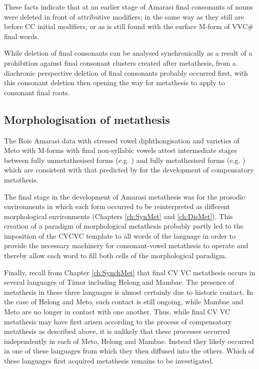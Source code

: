 These facts indicate that at an earlier
stage of Amarasi final consonants of nouns were
deleted in front of attributive modifiers;
in the same way as they still are before CC initial modifiers,
or as is still found with the surface M-form of VVC{\#} final words.

While deletion of final consonants
can be analysed synchronically as a result of a prohibition against
final consonant clusters created after metathesis,
from a diachronic perspective deletion
of final consonants probably occurred first, with
this consonant deletion then opening the way for
metathesis to apply to consonant final roots.

\subsection{Morphologisation of metathesis}
The Ro{\Q}is Amarasi data with stressed vowel diphthongisation
and varieties of Meto with M-forms with final non-syllabic vowels
attest intermediate stages between fully unmetathesised
forms (e.g. ) and fully metathesised forms
(e.g. ) which are consistent
with that predicted by \citet{blga98} for the development of compensatory metathesis.

The final stage in the development of Amarasi metathesis was
for the prosodic environments in which each form occurred
to be reinterpreted as different morphological environments
(Chapters \ref{ch:SynMet} and \ref{ch:DisMet}).
This creation of a paradigm of morphological metathesis
probably partly led to the imposition of the CVCVC template to all words of the language
in order to provide the necessary machinery for consonant-vowel metathesis to operate
and thereby allow each word to fill both cells of the morphological paradigm.

Finally, recall from Chapter \ref{ch:SynchMet} that final CV {\ra} VC
metathesis occurs in several languages of Timor including Helong and Mambae.
The presence of metathesis in these three languages
is almost certainly due to historic contact.
In the case of Helong and Meto, such contact is still ongoing,
while Mambae and Meto are no longer in contact with one another.
Thus, while final CV {\ra} VC metathesis may have first arisen
according to the process of compensatory metathesis as described above,
it is unlikely that these processes occurred independently
in each of Meto, Helong and Mambae. Instead they likely occurred
in one of these languages from which they then diffused into the others.
Which of these languages first acquired metathesis remains to be investigated.